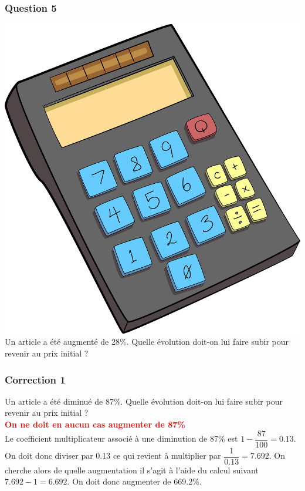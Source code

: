 \documentclass[15pt, mathserif]{beamer}
\begin{document}
\begin{frame} 
	\frametitle{Question 5}
 \includegraphics[scale=0.01]{calculatrice} Un article a été augmenté de 28\%. Quelle évolution doit-on lui faire subir pour revenir au prix initial ? \end{frame}


\begin{frame}
\vspace{-10mm}
	\frametitle{Correction 1}
\vspace*{1cm} Un article a été diminué de 87\%. Quelle évolution doit-on lui faire subir pour revenir au prix initial ? \\ \bcattention \textcolor{red}{\textbf{On ne doit en aucun cas augmenter de 87\%}} \\ Le coefficient multiplicateur associé à une diminution de 87\% est $1-\dfrac{87}{100}=0.13$. On doit donc diviser par 0.13 ce qui revient à multiplier par $\dfrac{1}{0.13}=7.692$. On cherche alors de quelle augmentation il s'agit à l'aide du calcul suivant $7.692-1=6.692$. On doit donc augmenter de 669.2\%. \\ \begin{center}  
  \end{center}\end{frame}
\end{document}
